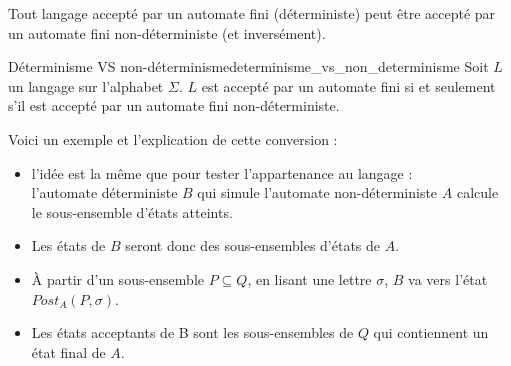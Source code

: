 Tout langage accepté par un automate fini (déterministe) peut être accepté par un automate fini non-déterministe
 (et inversément).
\begin{theorem}{Déterminisme VS non-déterminisme}{determinisme_vs_non_determinisme}
    Soit $L$ un langage sur l'alphabet $\Sigma$. $L$ est accepté par un automate fini si et seulement s'il est accepté par un
    automate fini non-déterministe.
\end{theorem}
\begin{example}
    Voici un exemple et l'explication de cette conversion :
    \begin{itemize}[label=\textbullet]
        \item l'idée est la même que pour tester l'appartenance au langage :\\
        l'automate déterministe $B$ qui simule l'automate non-déterministe $A$ calcule le sous-ensemble d'états atteints.
        \item Les états de $B$ seront donc des sous-ensembles d'états de $A$.
        \item À partir d'un sous-ensemble $P \subseteq Q$, en lisant une lettre $\sigma$, $B$ va vers l'état $Post_A(P,\sigma)$.
        \item Les états acceptants de B sont les sous-ensembles de $Q$ qui contiennent un état final de $A$.
    \end{itemize}
    \begin{figure}[H]
        \centering
    \end{figure}
    \begin{figure}[H]
        \centering
        \begin{tikzpicture} [node distance = 3cm, 
            on grid, 
            auto,
            every loop/.style={stealth-}]
        

\end{tikzpicture}
\end{figure}
\end{example}
